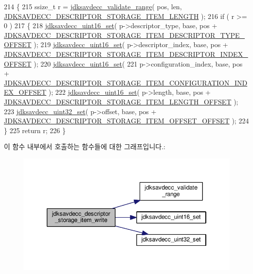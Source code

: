 \begin{DoxyCode}
214 \{
215     ssize\_t r = \hyperlink{group__util_ga9c02bdfe76c69163647c3196db7a73a1}{jdksavdecc\_validate\_range}( pos, len, 
      \hyperlink{group__descriptor__storage__item_ga929fd9464abbbbf3d66fc15109d022b3}{JDKSAVDECC\_DESCRIPTOR\_STORAGE\_ITEM\_LENGTH} );
216     \textcolor{keywordflow}{if} ( r >= 0 )
217     \{
218         \hyperlink{group__endian_ga14b9eeadc05f94334096c127c955a60b}{jdksavdecc\_uint16\_set}( p->descriptor\_type, base, pos + 
      \hyperlink{group__descriptor__storage__item_gae98a7643c1209f2ed405f156d01df21a}{JDKSAVDECC\_DESCRIPTOR\_STORAGE\_ITEM\_DESCRIPTOR\_TYPE\_OFFSET}
       );
219         \hyperlink{group__endian_ga14b9eeadc05f94334096c127c955a60b}{jdksavdecc\_uint16\_set}( p->descriptor\_index, base, pos + 
      \hyperlink{group__descriptor__storage__item_ga91a9b298385f93e5d97973b84a3c1c50}{JDKSAVDECC\_DESCRIPTOR\_STORAGE\_ITEM\_DESCRIPTOR\_INDEX\_OFFSET}
       );
220         \hyperlink{group__endian_ga14b9eeadc05f94334096c127c955a60b}{jdksavdecc\_uint16\_set}(
221             p->configuration\_index, base, pos + 
      \hyperlink{group__descriptor__storage__item_ga7206999291660720b4a417c04b96c57b}{JDKSAVDECC\_DESCRIPTOR\_STORAGE\_ITEM\_CONFIGURATION\_INDEX\_OFFSET}
       );
222         \hyperlink{group__endian_ga14b9eeadc05f94334096c127c955a60b}{jdksavdecc\_uint16\_set}( p->length, base, pos + 
      \hyperlink{group__descriptor__storage__item_ga0af0a97779ffef38b1266e5443eef4e5}{JDKSAVDECC\_DESCRIPTOR\_STORAGE\_ITEM\_LENGTH\_OFFSET} );
223         \hyperlink{group__endian_ga59b24ae6f7f47ca4d24ea337543162bf}{jdksavdecc\_uint32\_set}( p->offset, base, pos + 
      \hyperlink{group__descriptor__storage__item_ga000aff4bba560ff201846087f2a3744c}{JDKSAVDECC\_DESCRIPTOR\_STORAGE\_ITEM\_OFFSET\_OFFSET} );
224     \}
225     \textcolor{keywordflow}{return} r;
226 \}
\end{DoxyCode}


이 함수 내부에서 호출하는 함수들에 대한 그래프입니다.\+:
\nopagebreak
\begin{figure}[H]
\begin{center}
\leavevmode
\includegraphics[width=346pt]{group__descriptor__storage__item_gabbb19e7d130d5da54877e56927078a7d_cgraph}
\end{center}
\end{figure}


